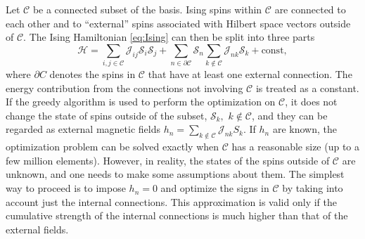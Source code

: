 Let $\mathcal{C}$ be a connected subset of the basis. Ising spins within $\mathcal{C}$ are connected to each other and to ``external'' spins associated with Hilbert space vectors outside of $\mathcal{C}$. The Ising Hamiltonian \eqref{eq:Ising} can then be split into three parts
\begin{equation}
    \mathcal{H} = \sum\limits_{i,j \in \mathcal{C}} \mathcal{J}_{ij} \mathcal{S}_i \mathcal{S}_j + \sum\limits_{n \in \partial \mathcal{C}} \mathcal{S}_n\sum\limits_{k \notin \mathcal{C}} \mathcal{J}_{nk} \mathcal{S}_k + \text{const},
\end{equation}
where $\partial C$ denotes the spins in $\mathcal{C}$ that have at least one external connection. The energy contribution from the connections not involving $\mathcal{C}$ is treated as a constant. If the greedy algorithm is used to perform the optimization on $\mathcal{C}$, it does not change the state of spins outside of the subset, $\mathcal{S}_k, \,\, k \notin \mathcal{C}$, and they can be regarded as external magnetic fields $h_n=\sum\limits_{k \notin \mathcal{C}} \mathcal{J}_{nk} S_k$. If $h_n$ are known, the optimization problem can be solved exactly when $\mathcal{C}$ has a reasonable size (up to a few million elements). However, in reality, the states of the spins outside of $\mathcal{C}$ are unknown, and one needs to make some assumptions about them. The simplest way to proceed is to impose $h_n=0$ and optimize the signs in $\mathcal{C}$ by taking into account just the internal connections. This approximation is valid only if the cumulative strength of the internal connections is much higher than that of the external fields.


